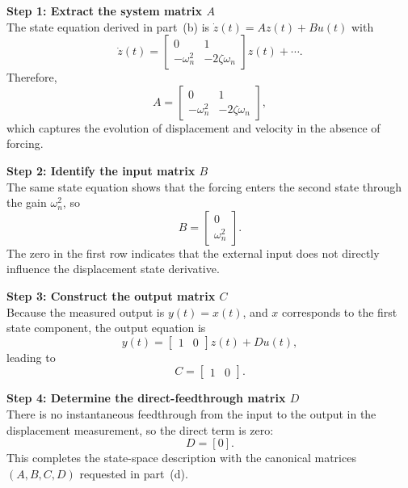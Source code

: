 \documentclass[12pt]{article}
\begin{document}
\begin{stepbox}
\textbf{Step 1: Extract the system matrix $A$}\\[0.5em]
The state equation derived in part~(b) is $\dot{z}(t) = A z(t) + B u(t)$ with
\[
\dot{z}(t) =
\begin{bmatrix}
0 & 1 \\
-\omega_n^2 & -2\zeta\omega_n
\end{bmatrix} z(t) + \cdots.
\]
Therefore,
\[
A =
\begin{bmatrix}
0 & 1 \\
-\omega_n^2 & -2\zeta\omega_n
\end{bmatrix},
\]
which captures the evolution of displacement and velocity in the absence of forcing.
\end{stepbox}

\begin{stepbox}
\textbf{Step 2: Identify the input matrix $B$}\\[0.5em]
The same state equation shows that the forcing enters the second state through the gain $\omega_n^2$, so
\[
B =
\begin{bmatrix}
0 \\
\omega_n^2
\end{bmatrix}.
\]
The zero in the first row indicates that the external input does not directly influence the displacement state derivative.
\end{stepbox}

\begin{stepbox}
\textbf{Step 3: Construct the output matrix $C$}\\[0.5em]
Because the measured output is $y(t) = x(t)$, and $x$ corresponds to the first state component, the output equation is
\[
y(t) = \begin{bmatrix} 1 & 0 \end{bmatrix} z(t) + D u(t),
\]
leading to
\[
C = \begin{bmatrix} 1 & 0 \end{bmatrix}.
\]
\end{stepbox}

\begin{stepbox}
\textbf{Step 4: Determine the direct-feedthrough matrix $D$}\\[0.5em]
There is no instantaneous feedthrough from the input to the output in the displacement measurement, so the direct term is zero:
\[
D = [0].
\]
This completes the state-space description with the canonical matrices $(A,B,C,D)$ requested in part~(d).
\end{stepbox}
\end{document}
